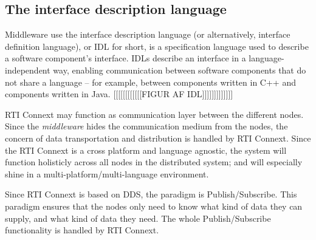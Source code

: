 \subsection{The interface description language}
Middleware use the interface description language (or alternatively, interface definition language), or IDL for short, is a specification language used to describe a software component's interface. IDLs describe an interface in a language-independent way, enabling communication between software components that do not share a language – for example, between components written in C++ and components written in Java.
[[[[[[[[[[[[FIGUR AF IDL]]]]]]]]]]]]]

RTI Connext may function as communication layer between the different nodes. Since the \emph{middleware} hides the communication medium from the nodes, the concern of data transportation and distribution is handled by RTI Connext.
Since the RTI Connext is a cross platform and language agnostic, the system will function holisticly across all nodes in the distributed system; and will especially shine in a multi-platform/multi-language environment.

Since RTI Connext is based on DDS, the paradigm is Publish/Subscribe. This paradigm ensures that the nodes only need to know what kind of data they can supply, and what kind of data they need. The whole Publish/Subscribe functionality is handled by RTI Connext. 